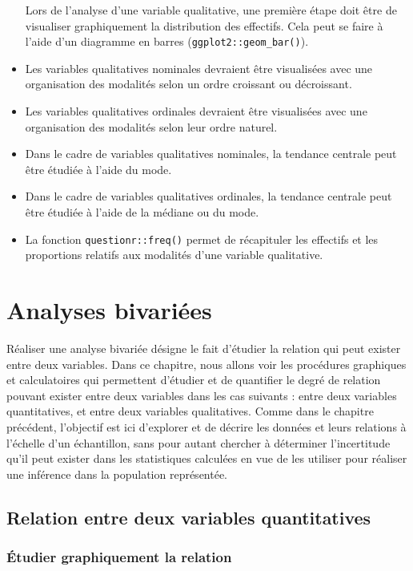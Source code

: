 \documentclass[
  letterpaper,
]{book}
\begin{document}
\begin{itemize}
  Lors de l'analyse d'une variable qualitative, une première étape doit
  être de visualiser graphiquement la distribution des effectifs. Cela
  peut se faire à l'aide d'un diagramme en barres
  (\texttt{ggplot2::geom\_bar()}).
\item
  Les variables qualitatives nominales devraient être visualisées avec
  une organisation des modalités selon un ordre croissant ou
  décroissant.
\item
  Les variables qualitatives ordinales devraient être visualisées avec
  une organisation des modalités selon leur ordre naturel.
\item
  Dans le cadre de variables qualitatives nominales, la tendance
  centrale peut être étudiée à l'aide du mode.
\item
  Dans le cadre de variables qualitatives ordinales, la tendance
  centrale peut être étudiée à l'aide de la médiane ou du mode.
\item
  La fonction \texttt{questionr::freq()} permet de récapituler les
  effectifs et les proportions relatifs aux modalités d'une variable
  qualitative.
\end{itemize}

\chapter{Analyses bivariées}\label{analyses-bivariuxe9es}

Réaliser une analyse bivariée désigne le fait d'étudier la relation qui
peut exister entre deux variables. Dans ce chapitre, nous allons voir
les procédures graphiques et calculatoires qui permettent d'étudier et
de quantifier le degré de relation pouvant exister entre deux variables
dans les cas suivants : entre deux variables quantitatives, et entre
deux variables qualitatives. Comme dans le chapitre précédent,
l'objectif est ici d'explorer et de décrire les données et leurs
relations à l'échelle d'un échantillon, sans pour autant chercher à
déterminer l'incertitude qu'il peut exister dans les statistiques
calculées en vue de les utiliser pour réaliser une inférence dans la
population représentée.

\section{Relation entre deux variables
quantitatives}\label{relation-entre-deux-variables-quantitatives}

\subsection{Étudier graphiquement la
relation}\label{uxe9tudier-graphiquement-la-relation}
\end{document}
